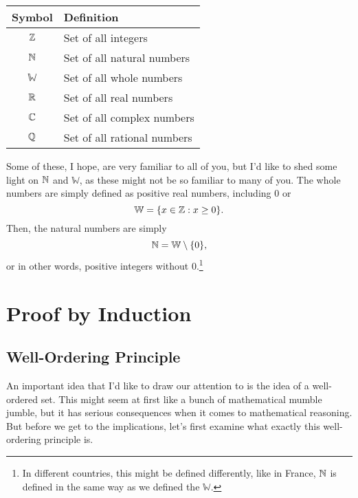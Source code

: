 \begin{center}
	\begin{longtable}{| c | m{6cm} |}
		\hline 
		Symbol & Definition \\
		\hline 
		$\mathbb{Z}$ & Set of all integers \\
		\hline
		$\mathbb{N}$ & Set of all natural numbers \\ 
		\hline
		$\mathbb{W}$ & Set of all whole numbers \\
		\hline
		$\mathbb{R}$ & Set of all real numbers \\
		\hline
		$\mathbb{C}$ & Set of all complex numbers \\
		\hline
		$\mathbb{Q}$ & Set of all rational numbers \\
		\hline
	\end{longtable}
\end{center}

Some of these, I hope, are very familiar to all of you, but I'd like to shed some light on $\mathbb{N}$ and $\mathbb{W}$, as these might not be so familiar to many of you. The whole numbers are simply defined as positive real numbers, including 0 or
$$\mathbb{W}=\{x\in \mathbb{Z} : x\ge 0\}.$$
Then, the natural numbers are simply
$$\mathbb{N}=\mathbb{W}\setminus\{0\},$$
or in other words, positive integers without 0.\footnote{In different countries, this might be defined differently, like in France, $\mathbb{N}$ is defined in the same way as we defined the $\mathbb{W}$.}

\section{Proof by Induction}
\subsection{Well-Ordering Principle}
An important idea that I'd like to draw our attention to is the idea of a well-ordered set.
This might seem at first like a bunch of mathematical mumble jumble, but it has serious consequences when it comes to mathematical reasoning.
But before we get to the implications, let's first examine what exactly this well-ordering principle is. 

